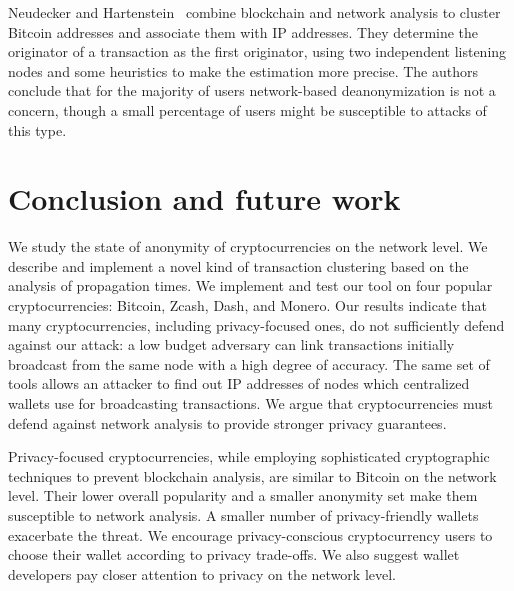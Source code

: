 Neudecker and Hartenstein~\cite{Neudecker2017} combine blockchain and network analysis to cluster Bitcoin addresses and associate them with IP addresses.
They determine the originator of a transaction as the first originator, using two independent listening nodes and some heuristics to make the estimation more precise.
The authors conclude that for the majority of users network-based deanonymization is not a concern, though a small percentage of users might be susceptible to attacks of this type.



\section{Conclusion and future work} \label{sec:Ch03_Conclusion}

We study the state of anonymity of cryptocurrencies on the network level.
We describe and implement a novel kind of transaction clustering based on the analysis of propagation times.
We implement and test our tool on four popular cryptocurrencies: Bitcoin, Zcash, Dash, and Monero.
Our results indicate that many cryptocurrencies, including privacy-focused ones, do not sufficiently defend against our attack: a low budget adversary can link transactions initially broadcast from the same node with a high degree of accuracy.
The same set of tools allows an attacker to find out IP addresses of nodes which centralized wallets use for broadcasting transactions.
We argue that cryptocurrencies must defend against network analysis to provide stronger privacy guarantees.

Privacy-focused cryptocurrencies, while employing sophisticated cryptographic techniques to prevent blockchain analysis, are similar to Bitcoin on the network level.
Their lower overall popularity and a smaller anonymity set make them susceptible to network analysis.
A smaller number of privacy-friendly wallets exacerbate the threat.
We encourage privacy-conscious cryptocurrency users to choose their wallet according to privacy trade-offs.
We also suggest wallet developers pay closer attention to privacy on the network level.

